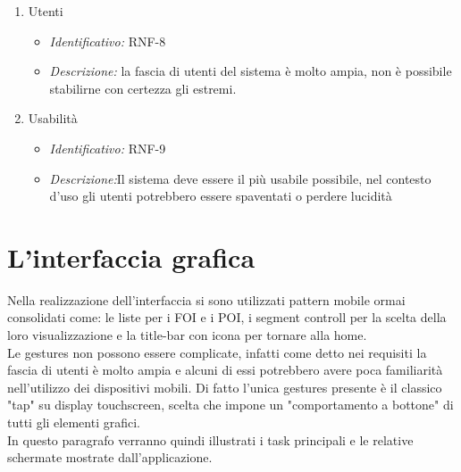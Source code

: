 \begin{enumerate}
\item Utenti
  \begin{itemize}
  \item\textit{Identificativo:} RNF-8
  \item\textit{Descrizione:} la fascia di utenti del sistema è molto ampia, non è possibile stabilirne con certezza gli estremi.
  \end{itemize}
  
  \item Usabilità
  \begin{itemize}
  \item\textit{Identificativo:} RNF-9
  \item\textit{Descrizione:}Il sistema deve essere il più usabile possibile, nel contesto d’uso gli utenti potrebbero essere spaventati o perdere lucidità
  \end{itemize}
  
\end{enumerate}

\section{L'interfaccia grafica}
Nella realizzazione dell'interfaccia si sono utilizzati pattern mobile ormai consolidati come: le liste per  i FOI e i POI, i segment controll per la scelta della loro visualizzazione e la title-bar con icona per tornare alla home.\\
Le gestures non possono essere complicate, infatti come detto nei requisiti la fascia di utenti è molto ampia e alcuni di essi potrebbero avere poca familiarità nell'utilizzo dei dispositivi mobili. Di fatto l'unica gestures presente è il classico "tap" su display touchscreen, scelta che impone un "comportamento a bottone" di tutti gli elementi grafici.\\
In questo paragrafo verranno quindi illustrati i task principali e le relative schermate mostrate dall'applicazione. \\

